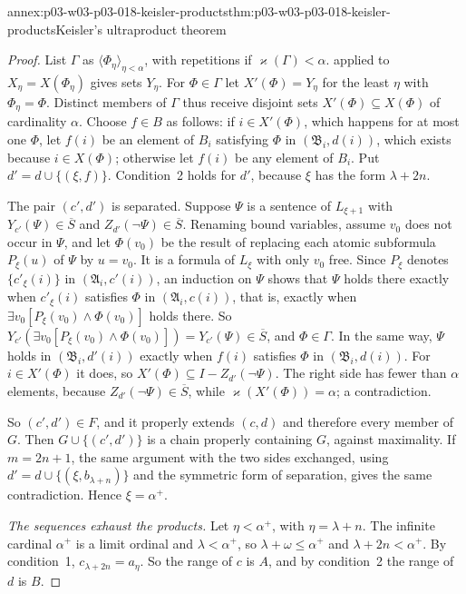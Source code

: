 \begin{annexitem}{annex:p03-w03-p03-018-keisler-products}{thm:p03-w03-p03-018-keisler-products}{Keisler's ultraproduct theorem}
\begin{proof}
List \(\Gamma\) as \(\langle\Phi_\eta\rangle_{\eta<\alpha}\), with
repetitions if \(\varkappa(\Gamma)<\alpha\).
 applied to
\(X_\eta=X(\Phi_\eta)\) gives sets \(Y_\eta\).  For \(\Phi\in\Gamma\) let
\(X'(\Phi)=Y_\eta\) for the least \(\eta\) with \(\Phi_\eta=\Phi\).  Distinct
members of \(\Gamma\) thus receive disjoint sets
\(X'(\Phi)\subseteq X(\Phi)\) of cardinality \(\alpha\).  Choose \(f\in B\)
as follows: if \(i\in X'(\Phi)\), which happens for at most one \(\Phi\), let
\(f(i)\) be an element of \(B_i\) satisfying \(\Phi\) in
\((\mathfrak B_i,d(i))\), which exists because \(i\in X(\Phi)\); otherwise
let \(f(i)\) be any element of \(B_i\).  Put \(d'=d\cup\{(\xi,f)\}\).
Condition~2 holds for \(d'\), because \(\xi\) has the form \(\lambda+2n\).

The pair \((c',d')\) is separated.  Suppose \(\Psi\) is a sentence of
\(L_{\xi+1}\) with \(Y_{c'}(\Psi)\in\overline S\) and
\(Z_{d'}(\neg\Psi)\in\overline S\).  Renaming bound variables, assume
\(v_0\) does not occur in \(\Psi\), and let \(\Phi(v_0)\) be the result of
replacing each atomic subformula \(P_\xi(u)\) of \(\Psi\) by \(u=v_0\).  It
is a formula of \(L_\xi\) with only \(v_0\) free.  Since \(P_\xi\) denotes
\(\{c'_\xi(i)\}\) in \((\mathfrak A_i,c'(i))\), an induction on \(\Psi\)
shows that \(\Psi\) holds there exactly when \(c'_\xi(i)\) satisfies \(\Phi\)
in \((\mathfrak A_i,c(i))\), that is, exactly when
\(\exists v_0[P_\xi(v_0)\wedge\Phi(v_0)]\) holds there.  So
\(Y_{c'}(\exists v_0[P_\xi(v_0)\wedge\Phi(v_0)])=Y_{c'}(\Psi)\in\overline
S\), and \(\Phi\in\Gamma\).  In the same way, \(\Psi\) holds in
\((\mathfrak B_i,d'(i))\) exactly when \(f(i)\) satisfies \(\Phi\) in
\((\mathfrak B_i,d(i))\).  For \(i\in X'(\Phi)\) it does, so
\(X'(\Phi)\subseteq I-Z_{d'}(\neg\Psi)\).  The right side has fewer than
\(\alpha\) elements, because \(Z_{d'}(\neg\Psi)\in\overline S\), while
\(\varkappa(X'(\Phi))=\alpha\); a contradiction.

So \((c',d')\in F\), and it properly extends \((c,d)\) and therefore every
member of \(G\).  Then \(G\cup\{(c',d')\}\) is a chain properly containing
\(G\), against maximality.  If \(m=2n+1\), the same argument with the two
sides exchanged, using \(d'=d\cup\{(\xi,b_{\lambda+n})\}\) and the symmetric
form of separation, gives the same contradiction.  Hence \(\xi=\alpha^+\).

\emph{The sequences exhaust the products.}  Let \(\eta<\alpha^+\), with
\(\eta=\lambda+n\).  The infinite cardinal \(\alpha^+\) is a limit ordinal
and \(\lambda<\alpha^+\), so \(\lambda+\omega\le\alpha^+\) and
\(\lambda+2n<\alpha^+\).  By condition~1, \(c_{\lambda+2n}=a_\eta\).  So the
range of \(c\) is \(A\), and by condition~2 the range of \(d\) is \(B\).


\end{proof}
\end{annexitem}
